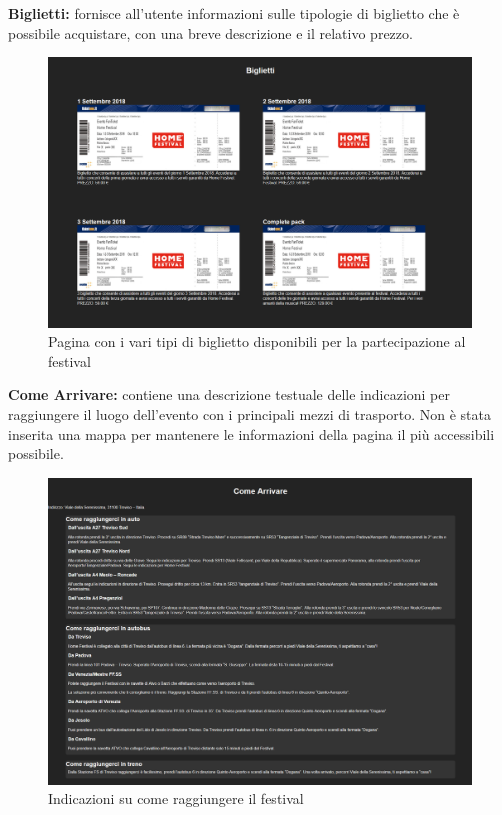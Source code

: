 \documentclass[10pt, a4paper]{article}
\begin{document}
\newpage 
\begin{flushleft}\textbf{Biglietti: }fornisce all'utente informazioni sulle tipologie di biglietto che è possibile acquistare, con una breve descrizione e il relativo prezzo.\end{flushleft}
\begin{figure}[h!]
  \centering
  \includegraphics[width=1\textwidth]{Images/biglietti.png}
  \caption{Pagina con i vari tipi di biglietto disponibili per la partecipazione al festival}
  \label{fig:biglietti}
\end{figure}
\begin{flushleft} \textbf{Come Arrivare: }contiene una descrizione testuale delle indicazioni per raggiungere il luogo dell'evento con i principali mezzi di trasporto. Non è stata inserita una mappa per mantenere le informazioni della pagina il più accessibili possibile. \end{flushleft}
\begin{figure}[h!]
  \centering
 \includegraphics[width=1\textwidth]{Images/indicazioni.png}
  \caption{Indicazioni su come raggiungere il festival}
  \label{fig:indicazioni}
\end{figure}
\end{document}
